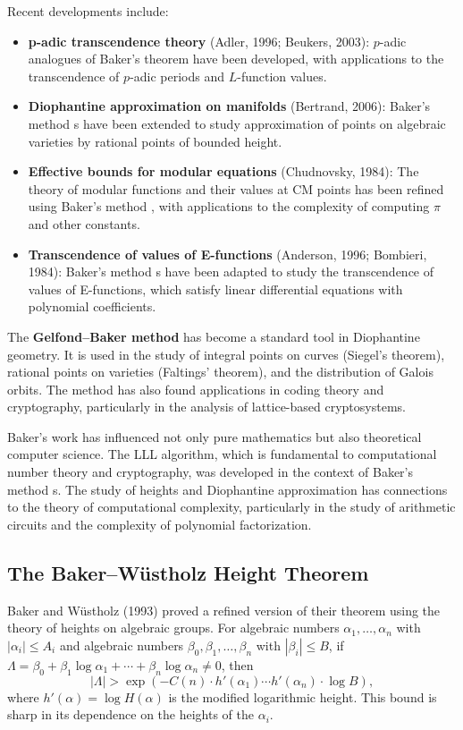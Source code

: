 Recent developments include:
\begin{itemize}
    \item \textbf{p-adic transcendence theory} (Adler, 1996; Beukers, 2003): $p$-adic analogues of Baker's theorem have been developed, with applications to the transcendence of $p$-adic periods and $L$-function values.
    \item \textbf{Diophantine approximation on manifolds} (Bertrand, 2006): Baker's method \cite{baker1966}s have been extended to study approximation of points on algebraic varieties by rational points of bounded height.
    \item \textbf{Effective bounds for modular equations} (Chudnovsky, 1984): The theory of modular functions and their values at CM points has been refined using Baker's method \cite{baker1966}, with applications to the complexity of computing $\pi$ and other constants.
    \item \textbf{Transcendence of values of E-functions} (Anderson, 1996; Bombieri, 1984): Baker's method \cite{baker1966}s have been adapted to study the transcendence of values of E-functions, which satisfy linear differential equations with polynomial coefficients.
\end{itemize}

The \textbf{Gelfond--Baker method} has become a standard tool in Diophantine geometry. It is used in the study of integral points on curves (Siegel's theorem), rational points on varieties (Faltings' theorem), and the distribution of Galois orbits. The method has also found applications in coding theory and cryptography, particularly in the analysis of lattice-based cryptosystems.

Baker's work has influenced not only pure mathematics but also theoretical computer science. The LLL algorithm, which is fundamental to computational number theory and cryptography, was developed in the context of Baker's method \cite{baker1966}s. The study of heights and Diophantine approximation has connections to the theory of computational complexity, particularly in the study of arithmetic circuits and the complexity of polynomial factorization.

\subsection*{The Baker--W\"{u}stholz Height Theorem}

Baker and W\"{u}stholz (1993) proved a refined version of their theorem using the theory of heights on algebraic groups. For algebraic numbers $\alpha_1, \ldots, \alpha_n$ with $|\alpha_i| \leq A_i$ and algebraic numbers $\beta_0, \beta_1, \ldots, \beta_n$ with $|\beta_i| \leq B$, if $\Lambda = \beta_0 + \beta_1 \log \alpha_1 + \cdots + \beta_n \log \alpha_n \neq 0$, then
\[
|\Lambda| > \exp\left(-C(n) \cdot h'(\alpha_1) \cdots h'(\alpha_n) \cdot \log B\right),
\]
where $h'(\alpha) = \log H(\alpha)$ is the modified logarithmic height. This bound is sharp in its dependence on the heights of the $\alpha_i$.


